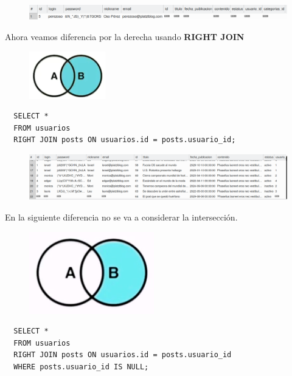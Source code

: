 \documentclass{article}
\begin{document}
\begin{figure}[h!]
  \centering
  \includegraphics[scale=0.64]{./Pictures/090_join_left_not_null.png}
\end{figure}

Ahora veamos diferencia por la derecha usando \textbf{RIGHT JOIN}\\

\begin{figure}[h!]
  \centering
  \includegraphics[scale=0.85]{./Pictures/091_join_right.png}
\end{figure}

\begin{verbatim}
  SELECT *
  FROM usuarios
  RIGHT JOIN posts ON usuarios.id = posts.usuario_id;
\end{verbatim}

\begin{figure}[h!]
  \centering
  \includegraphics[scale=0.50]{./Pictures/094_join_right.png}
\end{figure}

En la siguiente diferencia no se va a considerar la intersección.\\

\begin{figure}[h!]
  \centering
  \includegraphics[scale=0.65]{./Pictures/095_euler_rj_null.png}
\end{figure}

\begin{verbatim}
  SELECT *
  FROM usuarios
  RIGHT JOIN posts ON usuarios.id = posts.usuario_id
  WHERE posts.usuario_id IS NULL;
\end{verbatim}
\end{document}
